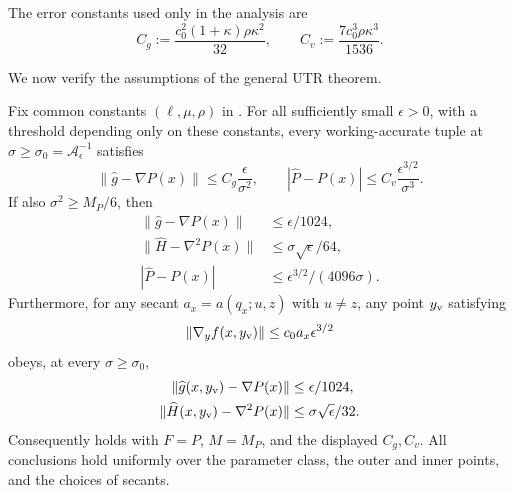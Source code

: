 \documentclass{article}
\begin{document}
The error constants used only in the analysis are
\begin{equation}\label{eq:gs-error-constants}
 C_g:=\frac{c_0^2(1+\kappa)\rho\kappa^2}{32},
 \qquad
 C_v:=\frac{7c_0^3\rho\kappa^3}{1536}.
\end{equation}

We now verify the assumptions of the general UTR theorem.

\begin{lemma}
\label{lem:gs-working-errors}
Fix common constants $(\ell,\mu,\rho)$ in .
For all sufficiently small $\epsilon>0$, with a threshold depending
only on these constants, every working-accurate tuple at
$\sigma\ge\sigma_0=\mathcal A_\epsilon^{-1}$ satisfies
\begin{equation}\label{eq:gs-working-errors}
 \|\widehat g-\nabla P(x)\|\le C_g\frac{\epsilon}{\sigma^2},
 \qquad
 |\widehat P-P(x)|\le C_v\frac{\epsilon^{3/2}}{\sigma^3}.
\end{equation}
If also $\sigma^2\ge M_P/6$, then
\begin{equation}\label{eq:working-safe-errors}
 \begin{aligned}
  \|\widehat g-\nabla P(x)\|&\le\epsilon/1024,\\
  \|\widehat H-\nabla^2P(x)\|&\le\sigma\sqrt\epsilon/64,\\
  |\widehat P-P(x)|&\le\epsilon^{3/2}/(4096\sigma).
 \end{aligned}
\end{equation}
Furthermore, for any secant $a_x=a(q_x;u,z)$ with $u\ne z$, any
point $y_{\rm v}$ satisfying
\begin{equation}\label{eq:validator-residual}
 \|\nabla_yf(x,y_{\rm v})\|\le c_0a_x\epsilon^{3/2}
\end{equation}
obeys, at every $\sigma\ge\sigma_0$,
\begin{equation}\label{eq:validator-errors}
 \begin{aligned}
  \|\widehat g(x,y_{\rm v})-\nabla P(x)\|&\le\epsilon/1024,\\
  \|\widehat H(x,y_{\rm v})-\nabla^2P(x)\|
       &\le\sigma\sqrt\epsilon/32.
 \end{aligned}
\end{equation}
Consequently  holds with $F=P$,
$M=M_P$, and the displayed $C_g,C_v$.
All conclusions hold uniformly over the parameter class,
the outer and inner points, and the choices of secants.
\end{lemma}
\end{document}
